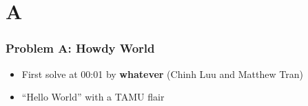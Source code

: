 \section{A}%
\label{sec:a}

\begin{frame}
  \frametitle{Problem A: Howdy World}

  \begin{itemize}
    \item First solve at 00:01 by \textbf{whatever} (Chinh Luu and Matthew Tran)
    \item ``Hello World'' with a TAMU flair
  \end{itemize}

\end{frame}